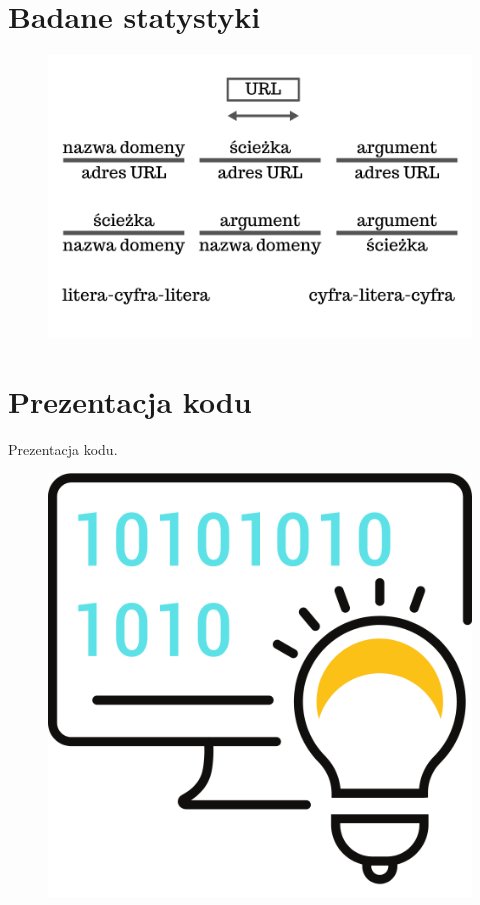 \documentclass{beamer}
\begin{document}
\section{Badane statystyki}
\begin{frame}
		
\begin{figure}
	\centering
	\includegraphics[width=1\linewidth]{../images/rys_3}
\end{figure}
\end{frame}

\section{Prezentacja kodu}
\begin{frame}
	\begin{center}
		\huge{Prezentacja kodu.}
	\end{center}
	\begin{figure}
		\centering
		\includegraphics[width=0.5\linewidth]{../images/rys_4}
		\label{fig:rys6}
	\end{figure}
\end{frame}
\end{document}
